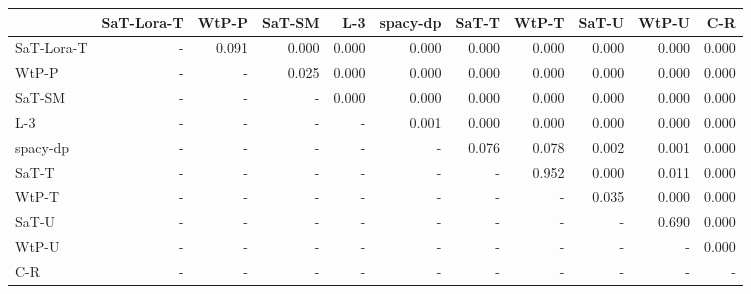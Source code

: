 \begin{tabular}{lrrrrrrrrrr}
\toprule
 & SaT-Lora-T & WtP-P & SaT-SM & L-3 & spacy-dp & SaT-T & WtP-T & SaT-U & WtP-U & C-R \\
\midrule
SaT-Lora-T & - & 0.091 & 0.000 & 0.000 & 0.000 & 0.000 & 0.000 & 0.000 & 0.000 & 0.000 \\
WtP-P & - & - & 0.025 & 0.000 & 0.000 & 0.000 & 0.000 & 0.000 & 0.000 & 0.000 \\
SaT-SM & - & - & - & 0.000 & 0.000 & 0.000 & 0.000 & 0.000 & 0.000 & 0.000 \\
L-3 & - & - & - & - & 0.001 & 0.000 & 0.000 & 0.000 & 0.000 & 0.000 \\
spacy-dp & - & - & - & - & - & 0.076 & 0.078 & 0.002 & 0.001 & 0.000 \\
SaT-T & - & - & - & - & - & - & 0.952 & 0.000 & 0.011 & 0.000 \\
WtP-T & - & - & - & - & - & - & - & 0.035 & 0.000 & 0.000 \\
SaT-U & - & - & - & - & - & - & - & - & 0.690 & 0.000 \\
WtP-U & - & - & - & - & - & - & - & - & - & 0.000 \\
C-R & - & - & - & - & - & - & - & - & - & - \\
\bottomrule
\end{tabular}


